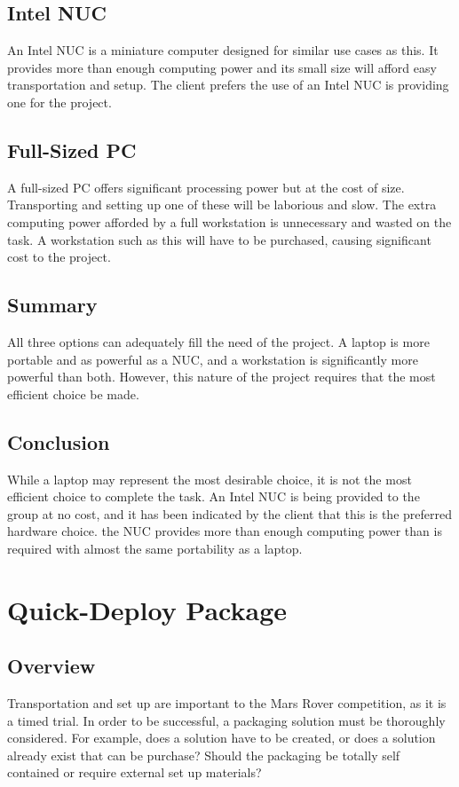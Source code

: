 \documentclass[onecolumn, draftclsnofoot, 10pt, compsoc]{IEEEtran}
\begin{document}
\subsection{Intel NUC}
An Intel NUC is a miniature computer designed for similar use cases as this.
It provides more than enough computing power and its small size will afford easy transportation and setup.
The client prefers the use of an Intel NUC is providing one for the project.

\subsection{Full-Sized PC}
A full-sized PC offers significant processing power but at the cost of size.
Transporting and setting up one of these will be laborious and slow.
The extra computing power afforded by a full workstation is unnecessary and wasted on the task.
A workstation such as this will have to be purchased, causing significant cost to the project.

\subsection{Summary}
All three options can adequately fill the need of the project.
A laptop is more portable and as powerful as a NUC, and a workstation is significantly more powerful than both.
However, this nature of the project requires that the most efficient choice be made.

\subsection{Conclusion}
While a laptop may represent the most desirable choice, it is not the most efficient choice to complete the task.
An Intel NUC is being provided to the group at no cost, and it has been indicated by the client that this is the preferred hardware choice.
the NUC provides more than enough computing power than is required with almost the same portability as a laptop.

\section{Quick-Deploy Package}

\subsection{Overview}
Transportation and set up are important to the Mars Rover competition, as it is a timed trial.
In order to be successful, a packaging solution must be thoroughly considered.
For example, does a solution have to be created, or does a solution already exist that can be purchase?
Should the packaging be totally self contained or require external set up materials?
\end{document}
